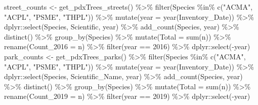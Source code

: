 \documentclass[12pt,twoside]{reedthesis}
\newenvironment{Shaded}{\begin{snugshade}}{\end{snugshade}}
\newcommand{\AttributeTok}[1]{\textcolor[rgb]{0.77,0.63,0.00}{#1}}
\newcommand{\DecValTok}[1]{\textcolor[rgb]{0.00,0.00,0.81}{#1}}
\newcommand{\FunctionTok}[1]{\textcolor[rgb]{0.00,0.00,0.00}{#1}}
\newcommand{\NormalTok}[1]{#1}
\newcommand{\OtherTok}[1]{\textcolor[rgb]{0.56,0.35,0.01}{#1}}
\newcommand{\SpecialCharTok}[1]{\textcolor[rgb]{0.00,0.00,0.00}{#1}}
\newcommand{\StringTok}[1]{\textcolor[rgb]{0.31,0.60,0.02}{#1}}
\begin{document}
\begin{Shaded}
\begin{Highlighting}[]
\NormalTok{street\_counts }\OtherTok{\textless{}{-}} \FunctionTok{get\_pdxTrees\_streets}\NormalTok{() }\SpecialCharTok{\%\textgreater{}\%}
    \FunctionTok{filter}\NormalTok{(Species }\SpecialCharTok{\%in\%} \FunctionTok{c}\NormalTok{(}\StringTok{"ACMA"}\NormalTok{, }\StringTok{"ACPL"}\NormalTok{, }\StringTok{"PSME"}\NormalTok{, }\StringTok{"THPL"}\NormalTok{)) }\SpecialCharTok{\%\textgreater{}\%}
    \FunctionTok{mutate}\NormalTok{(}\AttributeTok{year =} \FunctionTok{year}\NormalTok{(Inventory\_Date)) }\SpecialCharTok{\%\textgreater{}\%}
\NormalTok{    dplyr}\SpecialCharTok{::}\FunctionTok{select}\NormalTok{(Species, Scientific, year) }\SpecialCharTok{\%\textgreater{}\%}
    \FunctionTok{add\_count}\NormalTok{(Species, year) }\SpecialCharTok{\%\textgreater{}\%}
    \FunctionTok{distinct}\NormalTok{() }\SpecialCharTok{\%\textgreater{}\%}
    \FunctionTok{group\_by}\NormalTok{(Species) }\SpecialCharTok{\%\textgreater{}\%}
    \FunctionTok{mutate}\NormalTok{(}\AttributeTok{Total =} \FunctionTok{sum}\NormalTok{(n)) }\SpecialCharTok{\%\textgreater{}\%}
    \FunctionTok{rename}\NormalTok{(}\AttributeTok{Count\_2016 =}\NormalTok{ n) }\SpecialCharTok{\%\textgreater{}\%}
    \FunctionTok{filter}\NormalTok{(year }\SpecialCharTok{==} \DecValTok{2016}\NormalTok{) }\SpecialCharTok{\%\textgreater{}\%}
\NormalTok{    dplyr}\SpecialCharTok{::}\FunctionTok{select}\NormalTok{(}\SpecialCharTok{{-}}\NormalTok{year)}
\NormalTok{park\_counts }\OtherTok{\textless{}{-}} \FunctionTok{get\_pdxTrees\_parks}\NormalTok{() }\SpecialCharTok{\%\textgreater{}\%}
    \FunctionTok{filter}\NormalTok{(Species }\SpecialCharTok{\%in\%} \FunctionTok{c}\NormalTok{(}\StringTok{"ACMA"}\NormalTok{, }\StringTok{"ACPL"}\NormalTok{, }\StringTok{"PSME"}\NormalTok{, }\StringTok{"THPL"}\NormalTok{)) }\SpecialCharTok{\%\textgreater{}\%}
    \FunctionTok{mutate}\NormalTok{(}\AttributeTok{year =} \FunctionTok{year}\NormalTok{(Inventory\_Date)) }\SpecialCharTok{\%\textgreater{}\%}
\NormalTok{    dplyr}\SpecialCharTok{::}\FunctionTok{select}\NormalTok{(Species, Scientific\_Name, year) }\SpecialCharTok{\%\textgreater{}\%}
    \FunctionTok{add\_count}\NormalTok{(Species, year) }\SpecialCharTok{\%\textgreater{}\%}
    \FunctionTok{distinct}\NormalTok{() }\SpecialCharTok{\%\textgreater{}\%}
    \FunctionTok{group\_by}\NormalTok{(Species) }\SpecialCharTok{\%\textgreater{}\%}
    \FunctionTok{mutate}\NormalTok{(}\AttributeTok{Total =} \FunctionTok{sum}\NormalTok{(n)) }\SpecialCharTok{\%\textgreater{}\%}
    \FunctionTok{rename}\NormalTok{(}\AttributeTok{Count\_2019 =}\NormalTok{ n) }\SpecialCharTok{\%\textgreater{}\%}
    \FunctionTok{filter}\NormalTok{(year }\SpecialCharTok{==} \DecValTok{2019}\NormalTok{) }\SpecialCharTok{\%\textgreater{}\%}
\NormalTok{    dplyr}\SpecialCharTok{::}\FunctionTok{select}\NormalTok{(}\SpecialCharTok{{-}}\NormalTok{year)}
\end{Highlighting}
\end{Shaded}
\end{document}
